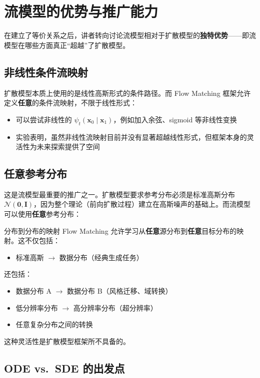 \documentclass[a4paper]{article}
\begin{document}
\section{流模型的优势与推广能力}

在建立了等价关系之后，讲者转向讨论流模型相对于扩散模型的\textbf{独特优势}——即流模型在哪些方面真正``超越''了扩散模型。

\subsection{非线性条件流映射}

扩散模型本质上使用的是线性高斯形式的条件路径。而 Flow Matching 框架允许定义\textbf{任意}的条件流映射，不限于线性形式：

\begin{itemize}
    \item 可以尝试非线性的 $\psi_t(\mathbf{x}_0 \mid \mathbf{x}_1)$，例如加入余弦、sigmoid 等非线性变换
    \item 实验表明，虽然非线性流映射目前并没有显著超越线性形式，但框架本身的灵活性为未来探索提供了空间
\end{itemize}

\subsection{任意参考分布}

这是流模型最重要的推广之一。扩散模型要求参考分布必须是标准高斯分布 $\mathcal{N}(\mathbf{0}, \mathbf{I})$，因为整个理论（前向扩散过程）建立在高斯噪声的基础上。而流模型可以使用\textbf{任意}参考分布：

\begin{importantbox}{分布到分布的映射}
Flow Matching 允许学习从\textbf{任意}源分布到\textbf{任意}目标分布的映射。这不仅包括：
\begin{itemize}
    \item 标准高斯 $\to$ 数据分布（经典生成任务）
\end{itemize}
还包括：
\begin{itemize}
    \item 数据分布 A $\to$ 数据分布 B（风格迁移、域转换）
    \item 低分辨率分布 $\to$ 高分辨率分布（超分辨率）
    \item 任意复杂分布之间的转换
\end{itemize}
这种灵活性是扩散模型框架所不具备的。
\end{importantbox}

\subsection{ODE vs.\ SDE 的出发点}
\end{document}
